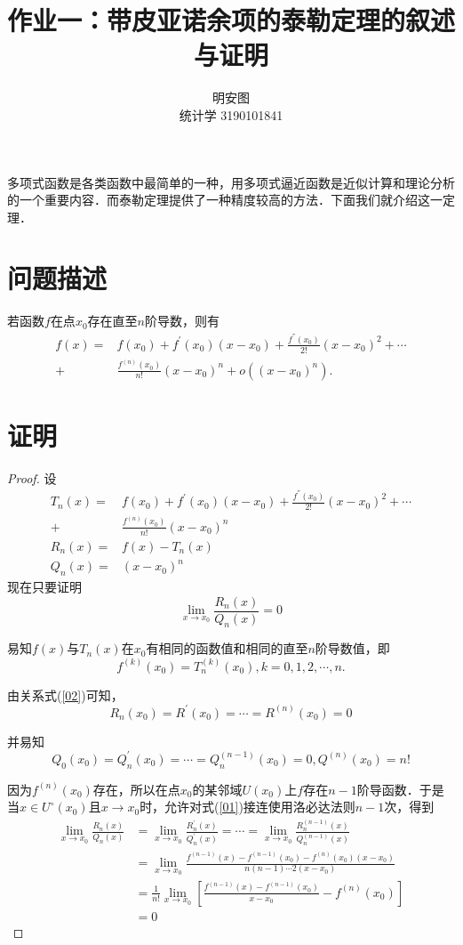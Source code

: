 \documentclass{ctexart}
\title{作业一：带皮亚诺余项的泰勒定理的叙述与证明}
\author{明安图 \\ 统计学 3190101841}
\begin{document}
\maketitle

多项式函数是各类函数中最简单的一种，用多项式逼近函数是近似计算和理论分析的一个重要内容．而泰勒定理提供了一种精度较高的方法．下面我们就介绍这一定理．
\section{问题描述}
若函数$f$在点$x_0$存在直至$n$阶导数，则有
$$
\begin{aligned}
  f(x)=&f(x_0)+f^{'}(x_0)(x-x_0)+\frac{f^{''}(x_0)}{2!}(x-x_0)^2+\cdots \\
  +&\frac{f^{(n)}(x_0)}{n!}(x-x_0)^n+o((x-x_0)^n).
\end{aligned}
$$

\section{证明}
\begin{proof}
设
$$
\begin{aligned}
  T_n(x)=&f(x_0)+f^{'}(x_0)(x-x_0)+\frac{f^{''}(x_0)}{2!}(x-x_0)^2+\cdots \\
  +&\frac{f^{(n)}(x_0)}{n!}(x-x_0)^n \\
  R_n(x)=&f(x)-T_n(x) \\
  Q_n(x)=&(x-x_0)^n
\end{aligned}
$$
现在只要证明
\begin{equation}
  \lim_{x \rightarrow x_{0}}\frac{R_n(x)}{Q_n(x)}=0
  \label{01}
\end{equation}

易知$f(x)$与$T_n(x)$在$x_0$有相同的函数值和相同的直至$n$阶导数值，即
\begin{equation}
  f^{(k)}(x_0)=T^{(k)}_n(x_0),k=0,1,2,\cdots,n.
  \label{02}
\end{equation}

由关系式(\ref{02})可知，
\begin{equation}
  R_n(x_0)=R^{'}(x_0)=\cdots=R^{(n)}(x_0)=0
\end{equation}

并易知
\begin{equation}
  Q_0(x_0)=Q^{'}_n(x_0)=\cdots=Q^{(n-1)}_n(x_0)=0,Q^{(n)}(x_0)=n!
\end{equation}

因为$f^{(n)}(x_0)$存在，所以在点$x_0$的某邻域$U(x_0)$上$f$存在$n-1$阶导函数．于是当$x \in U^{\circ}(x_0)$且$x \rightarrow x_0$时，允许对式(\ref{01})接连使用洛必达法则$n-1$次，得到
$$
\begin{aligned}
  \lim_{x \rightarrow x_{0}}\frac{R_n(x)}{Q_n(x)}&=\lim_{x \rightarrow x_{0}}\frac{R^{'}_n(x)}{Q^{'}_n(x)}=\cdots=\lim_{x \rightarrow x_{0}}\frac{R^{(n-1)}_n(x)}{Q^{(n-1)}_n(x)} \\
  &=\lim_{x \rightarrow x_{0}}\frac{f^{(n-1)}(x)-f^{(n-1)}(x_0)-f^{(n)}(x_0)(x-x_0)}{n(n-1)\cdots2(x-x_0)} \\
  &=\frac{1}{n!}\lim_{x \rightarrow x_{0}}\left[\frac{f^{(n-1)}(x)-f^{(n-1)}(x_0)}{x-x_0}-f^{(n)}(x_0)\right] \\
  &=0
\end{aligned}
$$
\end{proof}
\end{document}
